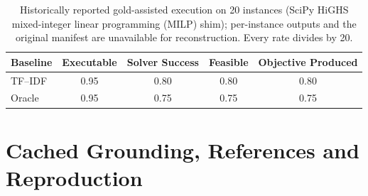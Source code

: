 \documentclass[pdflatex,sn-basic,Numbered]{sn-jnl}
\begin{document}
\begin{table}[htbp]
\centering
\caption{Historically reported gold-assisted execution on 20 instances (SciPy HiGHS mixed-integer linear programming (MILP) shim); per-instance outputs and the original manifest are unavailable for reconstruction. Every rate divides by 20.}
\label{tab:eng-solver}
\small
\begin{tabular}{lcccc}
  \toprule
  Baseline & Executable & Solver Success & Feasible & Objective Produced \\
  \midrule
  TF--IDF & 0.95 & 0.80 & 0.80 & 0.80 \\
  Oracle  & 0.95 & 0.75 & 0.75 & 0.75 \\
  \bottomrule
\end{tabular}
\end{table}
\FloatBarrier
\section{Cached Grounding, References and Reproduction}
\label{app:grounding-diagnostics}




\end{document}
